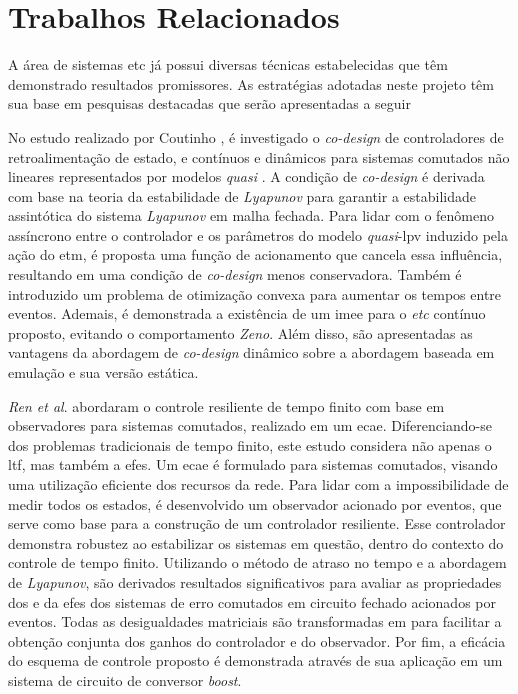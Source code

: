 \section{Trabalhos Relacionados}

A área de sistemas \acrshort{etc} já possui diversas técnicas estabelecidas que têm demonstrado resultados promissores. As estratégias adotadas neste projeto têm sua base em pesquisas destacadas que serão apresentadas a seguir

No estudo realizado por Coutinho \cite{coutinho2021}, é investigado o \textit{co-design} de controladores de retroalimentação de estado, e  contínuos e dinâmicos para sistemas comutados não lineares representados por modelos \textit{quasi} . A condição de \textit{co-design} é derivada com base na teoria da estabilidade de \textit{Lyapunov} para garantir a estabilidade assintótica do sistema \textit{Lyapunov} em malha fechada. Para lidar com o fenômeno assíncrono entre o controlador e os parâmetros do modelo \textit{quasi}-\acrshort{lpv} induzido pela ação do \acrshort{etm}, é proposta uma função de acionamento que cancela essa influência, resultando em uma condição de \textit{co-design} menos conservadora. Também é introduzido um problema de otimização convexa para aumentar os tempos entre eventos. Ademais, é demonstrada a existência de um \acrfull{imee} para o \textit{etc} contínuo proposto, evitando o comportamento \textit{Zeno}. Além disso, são apresentadas as vantagens da abordagem de \textit{co-design} dinâmico sobre a abordagem baseada em emulação e sua versão estática.

\textit{Ren et al}. \cite{Ren2018} abordaram o controle resiliente de tempo finito com base em observadores para sistemas comutados, realizado em um \acrfull{ecae}. Diferenciando-se dos problemas tradicionais de tempo finito, este estudo considera não apenas o \acrfull{ltf}, mas também a \acrfull{efes}. Um \acrshort{ecae} é formulado para sistemas comutados, visando uma utilização eficiente dos recursos da rede. Para lidar com a impossibilidade de medir todos os estados, é desenvolvido um observador acionado por eventos, que serve como base para a construção de um controlador resiliente. Esse controlador demonstra robustez ao estabilizar os sistemas em questão, dentro do contexto do controle de tempo finito. Utilizando o método de atraso no tempo e a abordagem de \textit{Lyapunov}, são derivados resultados significativos para avaliar as propriedades dos  e da \acrshort{efes} dos sistemas de erro comutados em circuito fechado acionados por eventos. Todas as desigualdades matriciais são transformadas em  para facilitar a obtenção conjunta dos ganhos do controlador e do observador. Por fim, a eficácia do esquema de controle proposto é demonstrada através de sua aplicação em um sistema de circuito de conversor \textit{boost}.

